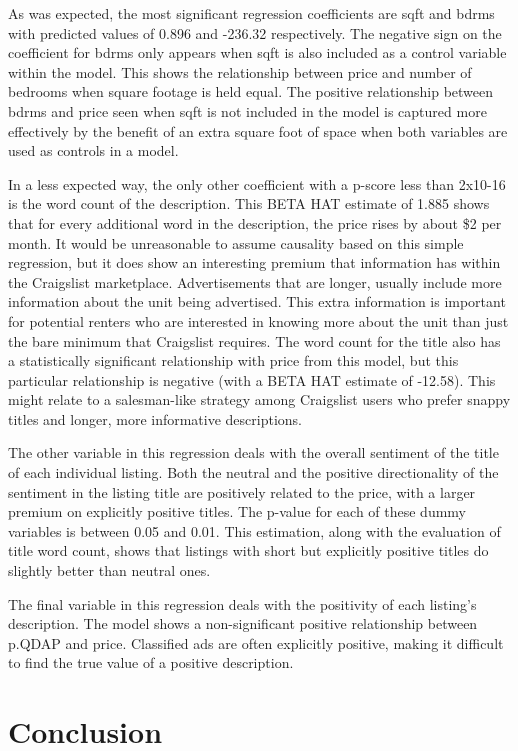 \documentclass[12pt,english]{article}
\begin{document}
As was expected, the most significant regression coefficients are sqft and bdrms with predicted values of 0.896 and -236.32 respectively. The negative sign on the coefficient for bdrms only appears when sqft is also included as a control variable within the model. This shows the relationship between price and number of bedrooms when square footage is held equal. The positive relationship between bdrms and price seen when sqft is not included in the model is captured more effectively by the benefit of an extra square foot of space when both variables are used as controls in a model. 

In a less expected way, the only other coefficient with a p-score less than 2x10-16 is the word count of the description. This BETA HAT estimate of 1.885 shows that for every additional word in the description, the price rises by about \$2 per month. It would be unreasonable to assume causality based on this simple regression, but it does show an interesting premium that information has within the Craigslist marketplace. Advertisements that are longer, usually include more information about the unit being advertised. This extra information is important for potential renters who are interested in knowing more about the unit than just the bare minimum that Craigslist requires. The word count for the title also has a statistically significant relationship with price from this model, but this particular relationship is negative (with a BETA HAT estimate of -12.58). This might relate to a salesman-like strategy among Craigslist users who prefer snappy titles and longer, more informative descriptions. 

The other variable in this regression deals with the overall sentiment of the title of each individual listing. Both the neutral and the positive directionality of the sentiment in the listing title are positively related to the price, with a larger premium on explicitly positive titles. The p-value for each of these dummy variables is between 0.05 and 0.01. This estimation, along with the evaluation of title word count, shows that listings with short but explicitly positive titles do slightly better than neutral ones. 

The final variable in this regression deals with the positivity of each listing’s description. The model shows a non-significant positive relationship between p.QDAP and price. Classified ads are often explicitly positive, making it difficult to find the true value of a positive description. 

\section{Conclusion}\label{sec:conclusion}
\end{document}
